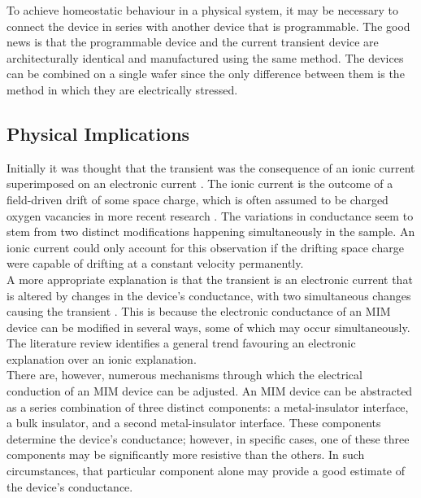 \noindent To achieve homeostatic behaviour in a physical system, it may be necessary to connect the device in series with another device that is programmable. The good news is that the programmable device and the current transient device are architecturally identical and manufactured using the same method. The devices can be combined on a single wafer since the only difference between them is the method in which they are electrically stressed.

\subsection[Physical Implications]{Physical Implications}

Initially it was thought that the transient was the consequence of an ionic current superimposed on an electronic current \cite{many1962theory, lampert1970current}. The ionic current is the outcome of a field-driven drift of some space charge, which is often assumed to be charged oxygen vacancies in more recent research \cite{saha2001transient}. The variations in conductance seem to stem from two distinct modifications happening simultaneously in the sample. An ionic current could only account for this observation if the drifting space charge were capable of drifting at a constant velocity permanently. \\

\noindent A more appropriate explanation is that the transient is an electronic current that is altered by changes in the device's conductance, with two simultaneous changes causing the transient \cite{meyer2005oxygen}. This is because the electronic conductance of an MIM device can be modified in several ways, some of which may occur simultaneously. The literature review identifies a general trend favouring an electronic explanation over an ionic explanation. \\

\noindent There are, however, numerous mechanisms through which the electrical conduction of an MIM device can be adjusted. An MIM device can be abstracted as a series combination of three distinct components: a metal-insulator interface, a bulk insulator, and a second metal-insulator interface. These components determine the device's conductance; however, in specific cases, one of these three components may be significantly more resistive than the others. In such circumstances, that particular component alone may provide a good estimate of the device's conductance. \\

